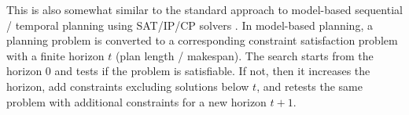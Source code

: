 This is also somewhat similar to the standard approach to model-based sequential / temporal planning using SAT/IP/CP solvers \cite{kautz1992planning,van2005optiplan}.
In model-based planning, a planning problem is converted to a corresponding constraint satisfaction problem with a finite horizon $t$ (plan length / makespan). The search starts from the horizon 0 and tests if the problem is satisfiable. If not, then it increases the horizon, add constraints excluding solutions below $t$, and retests the same problem with additional constraints for a new horizon $t+1$.







